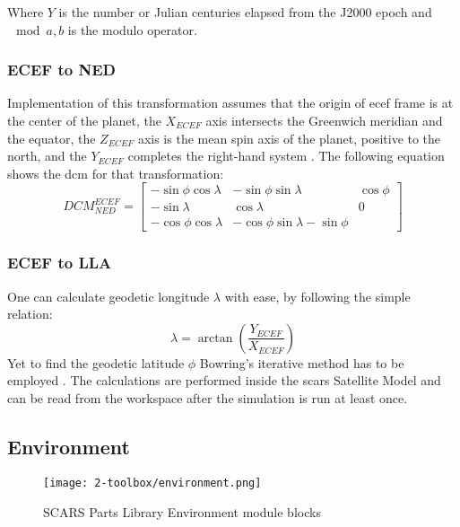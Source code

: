         Where $Y$ is the number or Julian centuries elapsed from the J2000 epoch and $\mod{a,b}$ is the modulo operator.

    \subsubsection{ECEF to NED}
       Implementation of this transformation assumes that the origin of \ac{ecef} frame is at the center of the planet, the $X_{ECEF}$ axis intersects the Greenwich meridian and the equator, the $Z_{ECEF}$ axis is the mean spin axis of the planet, positive to the north, and the $Y_{ECEF}$ completes the right-hand system \cite{aboutareospace}. The following equation shows the \ac{dcm} for that transformation:
       \begin{equation}
           DCM^{ECEF}_{NED} = \begin{bmatrix} -\sin\phi\cos\lambda & -\sin\phi\sin\lambda & \cos\phi\\
               -\sin\lambda & \cos\lambda & 0 \\
               -\cos\phi\cos\lambda & -\cos\phi\sin\lambda -\sin\phi \end{bmatrix}
       \end{equation}

    \subsubsection{ECEF to LLA}
        One can calculate geodetic longitude $\lambda$ with ease, by following the simple relation:
        \begin{equation}
            \lambda = \arctan(\frac{Y_{ECEF}}{X_{ECEF}})
        \end{equation}
        Yet to find the geodetic latitude $\phi$ Bowring's iterative method has to be employed \cite{gerdan1999transforming}. The calculations are performed inside the \ac{scars} Satellite Model and can be read from the workspace after the simulation is run at least once.

\clearpage
\subsection{Environment}\label{sec:environment}
    \begin{figure}[H]
        \centering
        \texttt{[image: 2-toolbox/environment.png]}
        \caption{SCARS Parts Library Environment module blocks}
        \label{fig:environment}
    \end{figure}


